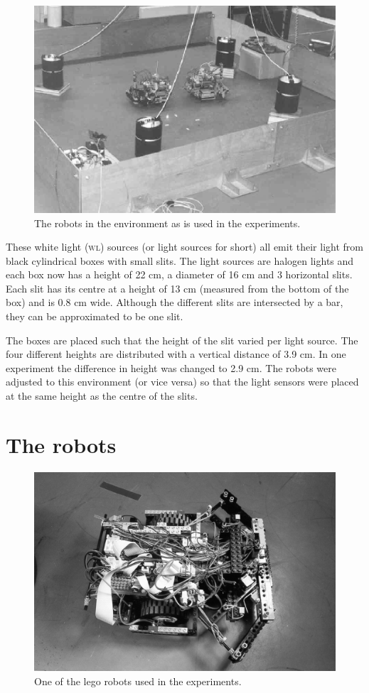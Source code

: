 \begin{figure}[t]
\centerline{\includegraphics[width=\textwidth]{robots//environment.eps}}
\caption{The robots in the environment as is used in the experiments.}
\label{f:robots:envir}
\end{figure}


These white light {\scshape (wl)} sources (or light sources for short) all emit their light from black cylindrical boxes with  small slits. The light sources are halogen lights and each box now has a height of 22 cm, a diameter of 16 cm and 3 horizontal slits. Each slit has its centre at a height of 13 cm (measured from the bottom of the box) and is 0.8 cm wide. Although the different slits are intersected by a bar, they can be approximated to be one slit.

The boxes are placed such that the height of the slit varied per light source. The four different heights are distributed with a vertical distance of 3.9 cm. In one experiment the difference in height was changed to 2.9 cm. The robots were adjusted to this environment (or vice versa) so that the light sensors were placed at the same height as the centre of the slits.

\section{The robots}\label{s:robots:robots}

\begin{figure}[t]
\centerline{\includegraphics[width=12cm]{robots//robot.eps}}
\caption{One of the {\sc lego} robots used in the experiments.}
\label{f:robots}
\end{figure}

